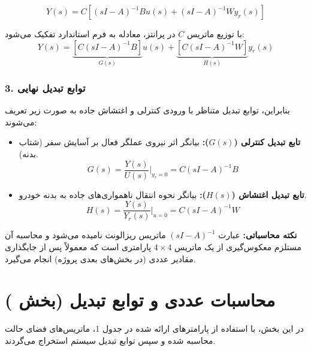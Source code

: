 \documentclass[a4paper]{article}
\begin{document}
	\begin{equation}
		Y(s) = C \left[ (sI - A)^{-1} Bu(s) + (sI - A)^{-1} Wy_r(s) \right]
	\end{equation}
	
	با توزیع ماتریس $C$ در پرانتز، معادله به فرم استاندارد تفکیک می‌شود:
	\begin{equation}
		Y(s) = \underbrace{\left[ C(sI - A)^{-1} B \right]}_{G(s)} u(s) + \underbrace{\left[ C(sI - A)^{-1} W \right]}_{H(s)} y_r(s)
	\end{equation}
	
	\subsubsection*{3. توابع تبدیل نهایی}
	بنابراین، توابع تبدیل متناظر با ورودی کنترلی و اغتشاش جاده به صورت زیر تعریف می‌شوند:
	
	\begin{itemize}
		\item \textbf{تابع تبدیل کنترلی ($G(s)$):} بیانگر اثر نیروی عملگر فعال بر آسایش سفر (شتاب بدنه).
		\begin{equation}
			G(s) = \frac{Y(s)}{U(s)}\bigg|_{y_r=0} = C(sI - A)^{-1} B
		\end{equation}
		
		\item \textbf{تابع تبدیل اغتشاش ($H(s)$):} بیانگر نحوه انتقال ناهمواری‌های جاده به بدنه خودرو.
		\begin{equation}
			H(s) = \frac{Y(s)}{Y_r(s)}\bigg|_{u=0} = C(sI - A)^{-1} W
		\end{equation}
	\end{itemize}
	
	\textbf{نکته محاسباتی:} عبارت $(sI - A)^{-1}$ ماتریس ریزالونت  نامیده می‌شود و محاسبه آن مستلزم معکوس‌گیری از یک ماتریس $4\times4$ پارامتری است که معمولاً پس از جایگذاری مقادیر عددی (در 
	بخش‌های بعدی پروژه) انجام می‌گیرد.
	
	\section{محاسبات عددی و توابع تبدیل (بخش )}
	در این بخش، با استفاده از پارامترهای ارائه شده در جدول 1، ماتریس‌های فضای حالت محاسبه شده و سپس توابع تبدیل سیستم استخراج می‌گردند.
	
\end{document}

